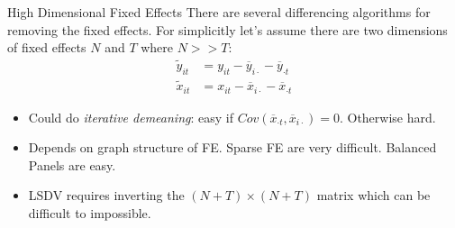 \begin{frame}{High Dimensional Fixed Effects}
There are several differencing algorithms for removing the fixed effects. For simplicitly let's assume there are two dimensions of fixed effects $N$ and $T$ where $N >> T$:
\begin{align*}
\tilde{y}_{it}&= y_{it} -\overline{y}_{i \cdot} - \overline{y}_{\cdot t}\\
\tilde{x}_{it}&= x_{it} -\overline{x}_{i \cdot} - \overline{x}_{\cdot t}
\end{align*}

\begin{itemize}
\item Could do \textit{iterative demeaning}: easy if $Cov(\overline{x}_{\cdot t},\overline{x}_{i \cdot})=0$. Otherwise hard.
\item Depends on \alert{graph structure} of FE. \alert{Sparse} FE are very difficult. \alert{Balanced Panels} are easy.
\item LSDV requires inverting the $(N+T) \times (N+T)$ matrix which can be difficult to impossible.
\end{itemize}
\end{frame}

